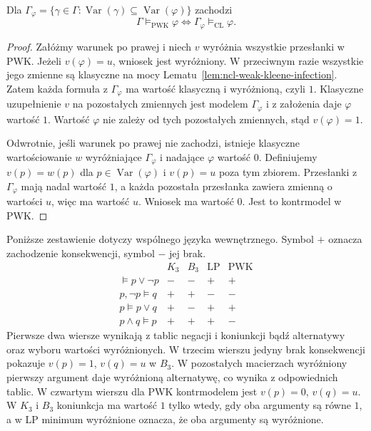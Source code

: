\begin{twierdzenie}
\label{thm:ncl-pwk-variable-inclusion}
Dla $\Gamma_\varphi=
\{\gamma\in\Gamma:
\operatorname{Var}(\gamma)\subseteq
\operatorname{Var}(\varphi)\}$ zachodzi
\[
 \Gamma\models_{\mathrm{PWK}}\varphi
 \iff \Gamma_\varphi\models_{\mathrm{CL}}\varphi.
\]
\end{twierdzenie}
\begin{proof}
Załóżmy warunek po prawej i niech $v$ wyróżnia
wszystkie przesłanki w PWK. Jeżeli $v(\varphi)=u$,
wniosek jest wyróżniony. W przeciwnym razie
wszystkie jego zmienne są klasyczne na mocy
Lematu~\ref{lem:ncl-weak-kleene-infection}.
Zatem każda formuła z $\Gamma_\varphi$ ma
wartość klasyczną i wyróżnioną, czyli $1$.
Klasyczne uzupełnienie $v$ na pozostałych
zmiennych jest modelem $\Gamma_\varphi$ i
z założenia daje $\varphi$ wartość $1$.
Wartość $\varphi$ nie zależy od tych pozostałych
zmiennych, stąd $v(\varphi)=1$.

Odwrotnie, jeśli warunek po prawej nie zachodzi,
istnieje klasyczne wartościowanie $w$ wyróżniające
$\Gamma_\varphi$ i nadające $\varphi$ wartość $0$.
Definiujemy $v(p)=w(p)$ dla
$p\in\operatorname{Var}(\varphi)$ i $v(p)=u$
poza tym zbiorem. Przesłanki z $\Gamma_\varphi$
mają nadal wartość $1$, a każda pozostała
przesłanka zawiera zmienną o wartości $u$,
więc ma wartość $u$. Wniosek ma wartość $0$.
Jest to kontrmodel w PWK.
\end{proof}

\begin{przyklad}
\label{ex:ncl-weak-strong-comparison}
Poniższe zestawienie dotyczy wspólnego języka
wewnętrznego. Symbol $+$ oznacza zachodzenie
konsekwencji, symbol $-$ jej brak.
\[
\begin{array}{l|cccc}
 & K_3&B_3&\mathrm{LP}&\mathrm{PWK}\\\hline
 \models p\vee\neg p &-&-&+&+\\
 p,\neg p\models q &+&+&-&-\\
 p\models p\vee q &+&-&+&+\\
 p\wedge q\models p &+&+&+&-
\end{array}
\]
Pierwsze dwa wiersze wynikają z tablic negacji
i koniunkcji bądź alternatywy oraz wyboru wartości
wyróżnionych. W trzecim wierszu jedyny brak
konsekwencji pokazuje $v(p)=1$, $v(q)=u$ w $B_3$.
W pozostałych macierzach wyróżniony pierwszy argument
daje wyróżnioną alternatywę, co wynika z odpowiednich
tablic. W czwartym wierszu dla PWK kontrmodelem
jest $v(p)=0$, $v(q)=u$. W $K_3$ i $B_3$ koniunkcja
ma wartość $1$ tylko wtedy, gdy oba argumenty są
równe $1$, a w LP minimum wyróżnione oznacza,
że oba argumenty są wyróżnione.
\end{przyklad}

